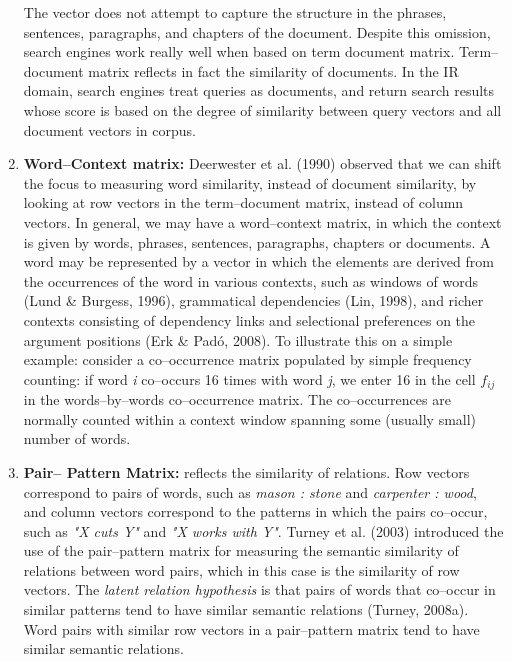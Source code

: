 \begin{enumerate}
The vector does not attempt to capture the structure in the phrases, sentences, paragraphs, and 
chapters of the document. Despite this omission, search engines work really well when based on term 
document matrix. Term--document matrix reflects in fact the similarity of documents. In the IR domain, 
search engines treat queries as documents, and return search results whose score is based on the degree of similarity 
between query vectors and all document vectors in corpus.
\item \textbf{Word--Context matrix:} Deerwester et al. (1990)\cite{deerwester90indexing} observed 
that we can shift the focus to measuring word similarity, instead of document similarity, by looking at 
row vectors in the term--document matrix, instead of column vectors. In general, we may have a 
word--context matrix, in which the context is given by words, phrases, sentences, paragraphs, chapters 
or documents. A word may be represented by a vector in which the elements are derived from the 
occurrences of the word in various contexts, such as windows of words (Lund \& Burgess, 1996)\cite{lundb96}, 
grammatical dependencies (Lin, 1998)\cite{lin1998}, and richer contexts consisting of dependency links 
and selectional preferences on the argument positions (Erk \& Pad\'o, 2008)\cite{erk_pado2008}. To 
illustrate this on a simple example: consider a co--occurrence matrix populated by simple frequency 
counting: if word \textit{i} co--occurs 16 times with word \textit{j}, we enter 16 in the cell $f_{ij}$ in 
the words--by--words co--occurrence matrix. The co--occurrences are normally counted within a 
context window spanning some (usually small) number of words.

\item \textbf{Pair-- Pattern Matrix:} reflects the similarity of relations. Row vectors correspond to pairs of words, such as \textit{mason : stone} and \textit{carpenter : wood}, and column vectors correspond to the patterns in which the pairs co--occur, such as \textit{"X cuts Y"} and \textit{"X works with Y"}. Turney et al. (2003) introduced the use of the pair--pattern matrix for measuring the semantic similarity of relations between word pairs, which in this case is the similarity of row vectors. The \textit{latent relation hypothesis} is that pairs of words that co--occur in similar patterns tend to have similar semantic relations (Turney, 2008a). Word pairs with similar row vectors in a pair--pattern matrix tend to have similar semantic relations.
\end{enumerate}

